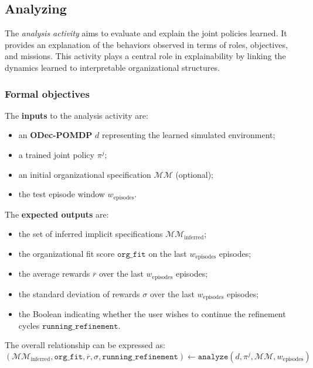 \documentclass[pdflatex,sn-mathphys-num]{sn-jnl}%
\theoremstyle{thmstyleone}%
\theoremstyle{thmstyletwo}%
\theoremstyle{thmstylethree}%
\begin{document}
\subsection{Analyzing}\label{sec:analyzing}


The \textit{analysis activity} aims to evaluate and explain the joint policies learned. It provides an explanation of the behaviors observed in terms of roles, objectives, and missions. This activity plays a central role in explainability by linking the dynamics learned to interpretable organizational structures.


\subsubsection*{Formal objectives}


The \textbf{inputs} to the analysis activity are:
\begin{itemize}
    \item an \textbf{ODec-POMDP} $d$ representing the learned simulated environment;
    \item a trained joint policy $\pi^j$;
    \item an initial organizational specification $\mathcal{MM}$ (optional);
    \item the test episode window $w_{\text{episodes}}$.
\end{itemize}

\noindent
The \textbf{expected outputs} are:
\begin{itemize}
    \item the set of inferred implicit specifications $\mathcal{MM}_{\text{inferred}}$;
    \item the organizational fit score $\texttt{org\_fit}$ on the last $w_{\text{episodes}}$ episodes;
    \item the average rewards $\overline{r}$ over the last $w_{\text{episodes}}$ episodes;
    \item the standard deviation of rewards $\sigma$ over the last $w_{\text{episodes}}$ episodes;
    \item the Boolean indicating whether the user wishes to continue the refinement cycles $\texttt{running\_refinement}$.
\end{itemize}

\noindent The overall relationship can be expressed as:
\[
    (\mathcal{MM}_{\text{inferred}}, \texttt{org\_fit}, \overline{r}, \sigma, \texttt{running\_refinement}) \gets \texttt{analyze}(d, \pi^j, \mathcal{MM}, w_{\text{episodes}})
\]
\end{document}
